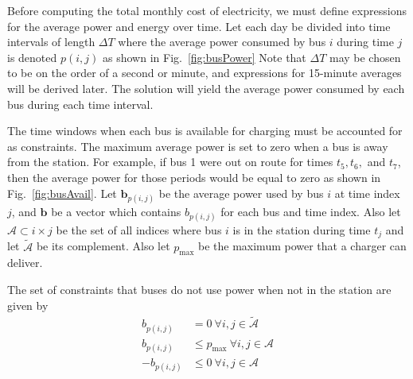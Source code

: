 Before computing the total monthly cost of electricity, we must define expressions for the average power and energy over time.  Let each day be divided into time intervals of length $\Delta T$ where the average power consumed by bus $i$ during time $j$ is denoted $p(i,j)$ as shown in Fig.~\ref{fig:busPower} Note that $\Delta T$ may be chosen to be on the order of a second or minute, and expressions for 15-minute averages will be derived later. The solution will yield the average power consumed by each bus during each time interval.
\par The time windows when each bus is available for charging must be accounted for as constraints.  The maximum average power is set to zero when a bus is away from the station. For example, if bus 1 were out on route for times $t_5, t_6,$ and $t_7$, then the average power for those periods would be equal to zero as shown in Fig.~\ref{fig:busAvail}. Let $\bm{b}_{p(i,j)}$ be the average power used by bus $i$ at time index $j$, and $\bm{b}$ be a vector which contains $b_{p(i,j)}$ for each bus and time index. Also let $\mathcal{A} \subset {i\times j}$  be the set of all indices where bus $i$ is in the station during time $t_j$ and let $\tilde{\mathcal{A}}$ be its complement. Also let $p_{\text{max}}$ be the maximum power that a charger can deliver. 
\par The set of constraints that buses do not use power when not in the station are given by
\begin{equation}\label{eqn:obj:power2}\begin{aligned}
	b_{p(i,j)} &= 0 \ \forall i,j \in \tilde{\mathcal{A}}  \\
	b_{p(i,j)} &\le p_{\text{max}} \ \forall i,j \in \mathcal{A} \\
	-b_{p(i,j)} &\le 0              \ \forall i,j \in \mathcal{A} 
\end{aligned}\end{equation}

